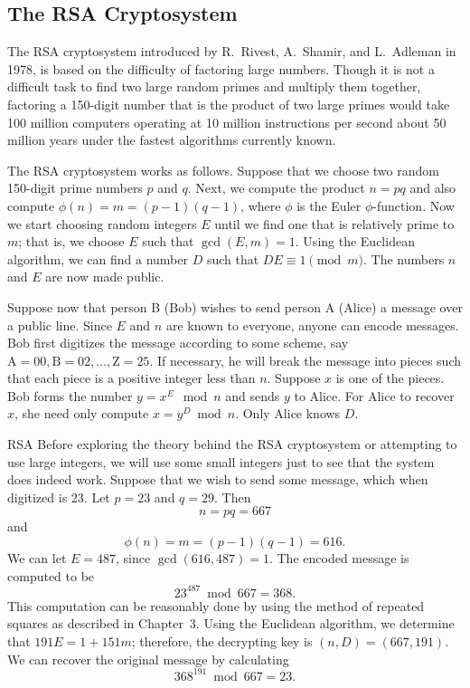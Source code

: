 \subsection*{The RSA Cryptosystem}
 
The RSA cryptosystem introduced by R.~Rivest,
A.~Shamir, and L.~Adleman in
1978, is based on the difficulty of factoring large numbers. Though it
is not a difficult task to find two large random primes and multiply
them together, factoring a 150-digit number that is the product of two
large primes would take 100 million computers operating at 10 million
instructions per second about 50 million years under the fastest
algorithms currently known.
 
 
The RSA cryptosystem
works as follows. Suppose that we choose two random 150-digit prime
numbers $p$ and $q$. Next, we compute the product $n= pq$ and also
compute $\phi(n) = m = (p - 1)(q-1)$, where $\phi$ is the Euler
$\phi$-function.  Now we start choosing random integers $E$ until we
find one that is relatively prime to $m$; that is, we choose $E$ such
that $\gcd(E, m) = 1$. Using the Euclidean algorithm, we can find a
number $D$ such that \mbox{$DE \equiv 1 \pmod{m}$}. The numbers $n$ and $E$
are now made public. 
 
 
Suppose now that person B (Bob) wishes to send person A (Alice) a
message over a public line. Since $E$ and $n$ are known to everyone,
anyone can encode messages. Bob first digitizes the message according
to some scheme, say $\mbox{A}  = 00, \mbox{B}  = 02, \ldots, \mbox{Z}=
25$. If necessary, he will break the message into pieces such that
each piece is a positive integer less than $n$.  Suppose $x$ is one of
the pieces.  Bob forms the number $y = x^E \mod n$ and sends $y$ to
Alice. For Alice to recover $x$, she need only compute $x = y^D \bmod
n$. Only Alice knows $D$.  
 
 
\begin{example}{RSA}
Before exploring the theory behind the RSA cryptosystem or attempting
to use large integers, we will use some small integers just to see
that the system does indeed work. Suppose that we wish to send some
message, which when digitized is 23. Let $p = 23$ and $q = 29$. Then 
\[
n = pq = 667
\]
and
\[
\phi(n) = m = (p - 1)(q - 1) = 616.
\]
We can let $E = 487$, since $\gcd(616, 487) = 1$. The encoded message
is computed to be  
\[
23^{487} \bmod 667 = 368.
\]
This computation can be reasonably done by using the method of
repeated squares as described in Chapter~3. Using the Euclidean
algorithm, we determine that $191 E = 1 + 151 m$; therefore, the
decrypting key is $(n, D) = ( 667, 191)$. We can recover the original 
message by calculating  
\[
368^{191} \bmod 667 = 23.
\]
\end{example}
 
